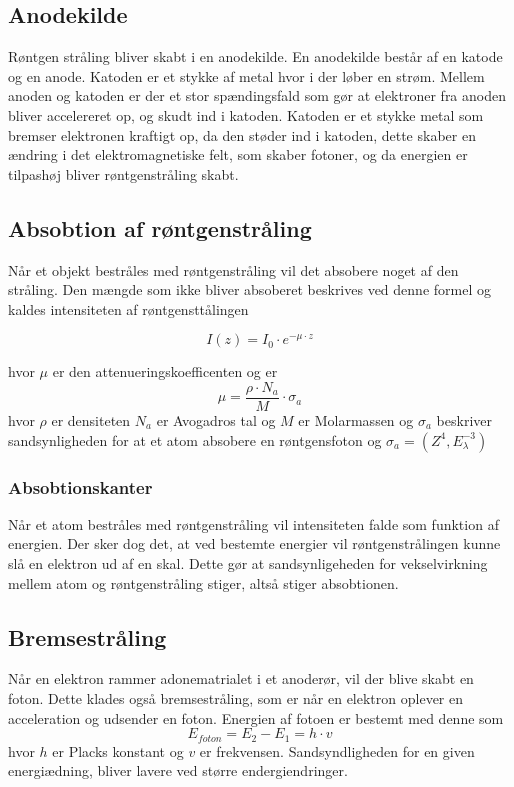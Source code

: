 \documentclass[a4paper,twoside]{article}
\begin{document}
\subsection{Anodekilde}
Røntgen stråling bliver skabt i en anodekilde. En anodekilde består af en katode og en anode. Katoden er et stykke af metal hvor i der løber en strøm. Mellem anoden og katoden er der et stor spændingsfald som gør at elektroner fra anoden bliver accelereret op, og skudt ind i katoden. Katoden er et stykke metal som bremser elektronen kraftigt op, da den støder ind i katoden, dette skaber en ændring i det elektromagnetiske felt, som skaber fotoner, og da energien er tilpashøj bliver røntgenstråling skabt.
\subsection{Absobtion af røntgenstråling}
Når et objekt bestråles med røntgenstråling vil det absobere noget af den stråling. Den mængde som ikke bliver absoberet beskrives ved denne formel og kaldes intensiteten af røntgensttålingen  

\begin{equation}
    I(z)=I_0\cdot e^{-\mu\cdot z}
\end{equation}

hvor $\mu$ er den attenueringskoefficenten og er 
\begin{equation}
    \mu=\frac{\rho\cdot N_a}{M}\cdot\sigma _a 
\end{equation}
hvor $\rho$ er densiteten $N_a$ er Avogadros tal og $M$ er Molarmassen og $\sigma _a$ beskriver sandsynligheden for at et atom absobere en røntgensfoton og $\sigma _a =(Z^4,E_\lambda^{-3})$

\subsubsection{Absobtionskanter}
Når et atom bestråles med røntgenstråling vil intensiteten falde som funktion af energien. Der sker dog det, at ved bestemte energier vil røntgenstrålingen kunne slå en elektron ud af en skal. Dette gør at sandsynligeheden for vekselvirkning mellem atom og røntgenstråling stiger, altså stiger absobtionen. 

\subsection{Bremsestråling}
Når en elektron rammer adonematrialet i et anoderør, vil der blive skabt en foton. Dette klades også bremsestråling, som er når en elektron oplever en acceleration og udsender en foton. Energien af fotoen er bestemt med denne som
\begin{equation}
    E_{foton}=E_2-E_1=h\cdot v
    \end{equation}
hvor $h$ er Placks konstant og $v$ er frekvensen. Sandsyndligheden for en given energiædning, bliver lavere ved større endergiendringer.
\end{document}
